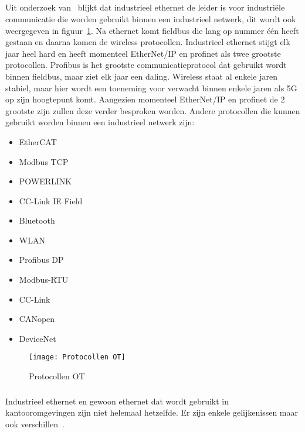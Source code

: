 \subsection{}
\label{subsec:OT protocollen}
Uit onderzoek van~\textcite{Thomas2020} blijkt dat industrieel ethernet de leider is voor industriële communicatie die worden gebruikt binnen een industrieel netwerk, dit wordt ook weergegeven in figuur~\ref{fig:2.8}. Na ethernet komt fieldbus die lang op nummer één heeft gestaan en daarna komen de wireless protocollen. Industrieel ethernet stijgt elk jaar heel hard en heeft momenteel EtherNet/IP en profinet als twee grootste protocollen. Profibus is het grootste communicatieprotocol dat gebruikt wordt binnen fieldbus, maar ziet elk jaar een daling. Wireless staat al enkele jaren stabiel, maar hier wordt een toeneming voor verwacht binnen enkele jaren als 5G op zijn hoogtepunt komt. Aangezien momenteel EtherNet/IP en profinet de 2 grootste zijn zullen deze verder besproken worden. Andere protocollen die kunnen gebruikt worden binnen een industrieel netwerk zijn:
\begin{itemize}
    \item EtherCAT
    \item Modbus TCP
    \item POWERLINK
    \item CC-Link IE Field
    \item Bluetooth
    \item WLAN
    \item Profibus DP
    \item Modbus-RTU
    \item CC-Link
    \item CANopen
    \item DeviceNet
\end{itemize}
\begin{figure}
    \texttt{[image: Protocollen OT]}
    \caption{Protocollen OT~\autocite{Thomas2020} \label{fig:2.8}} 
\end{figure} 

\subsubsection{}
\label{subsubsec:Industrieel ethernet}
Industrieel ethernet en gewoon ethernet dat wordt gebruikt in kantooromgevingen zijn niet helemaal hetzelfde. Er zijn enkele gelijkenissen maar ook verschillen~\autocite{Tannehill2020}.

